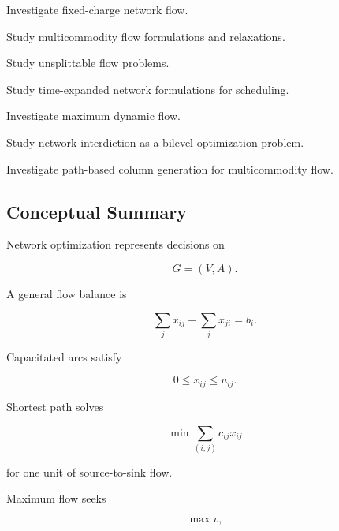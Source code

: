 \begin{exercise}[4]
Investigate fixed-charge network flow.
\end{exercise}

\begin{exercise}[4]
Study multicommodity flow formulations and relaxations.
\end{exercise}

\begin{exercise}[4]
Study unsplittable flow problems.
\end{exercise}

\begin{exercise}[4]
Study time-expanded network formulations for scheduling.
\end{exercise}

\begin{exercise}[4]
Investigate maximum dynamic flow.
\end{exercise}

\begin{exercise}[4]
Study network interdiction as a bilevel optimization problem.
\end{exercise}

\begin{exercise}[4]
Investigate path-based column generation for multicommodity flow.
\end{exercise}

\subsection{Conceptual Summary}
\label{subsec:network-optimization-summary}

Network optimization represents decisions on

\[
\boxed{
G=(V,A).
}
\]

A general flow balance is

\[
\boxed{
\sum_jx_{ij}
-
\sum_jx_{ji}
=
b_i.
}
\]

Capacitated arcs satisfy

\[
\boxed{
0\leq x_{ij}\leq u_{ij}.
}
\]

Shortest path solves

\[
\boxed{
\min
\sum_{(i,j)}
c_{ij}x_{ij}
}
\]

for one unit of source-to-sink flow.

Maximum flow seeks

\[
\boxed{
\max v,
}
\]


